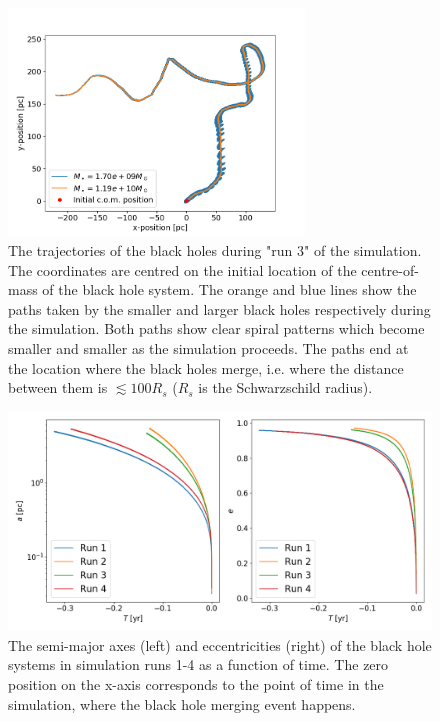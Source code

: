 \documentclass[english, oneside]{HYgradu}
\begin{document}
\begin{figure}[h]
	\centering	
	\includegraphics[width=0.7\textwidth]{Run3_Trajectory.png}	
	\caption{The trajectories of the black holes during "run 3" of the simulation. The coordinates are centred on the initial location of the centre-of-mass of the black hole system. The orange and blue lines show the paths taken by the smaller and larger black holes respectively during the simulation. Both paths show clear spiral patterns which become smaller and smaller as the simulation proceeds. The paths end at the location where the black holes merge, i.e. where the distance between them is $\lesssim 100 R_s$ ($R_s$ is the Schwarzschild radius).}
	\label{figure:run3_traj}
\end{figure}

\begin{figure}[h]
	\centering
	\includegraphics[width=\textwidth]{semi_major_and_ecc.png}
	\caption{The semi-major axes (left) and eccentricities (right) of the black hole systems in simulation runs 1-4 as a function of time. The zero position on the x-axis corresponds to the point of time in the simulation, where the black hole merging event happens.}
	\label{figure:semi_and_ecc}
\end{figure}
\end{document}

